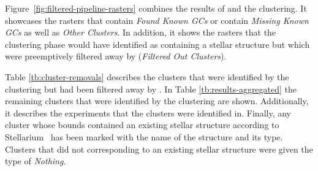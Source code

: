 Figure~\ref{fig:filtered-pipeline-rasters} combines the results of \blobdog{} and the clustering. It showcases the rasters that contain \textit{Found Known GCs} or contain \textit{Missing Known GCs} as well as \textit{Other Clusters}. In addition, it shows the rasters that the clustering phase would have identified as containing a stellar structure but which were preemptively filtered away by \blobdog{} (\textit{Filtered Out Clusters}).

Table \ref{tb:cluster-removals} describes the clusters that were identified by
the clustering but had been filtered away by \blobdog{}. In Table
\ref{tb:results-aggregated} the remaining clusters that were identified by the
clustering are shown. Additionally, it describes the experiments that the
clusters were identified in. Finally, any cluster whose bounds contained an
existing stellar structure according to Stellarium~\cite{Stellarium} has been
marked with the name of the structure and its type. Clusters that did not
corresponding to an existing stellar structure were given the type of
\textit{Nothing}.

